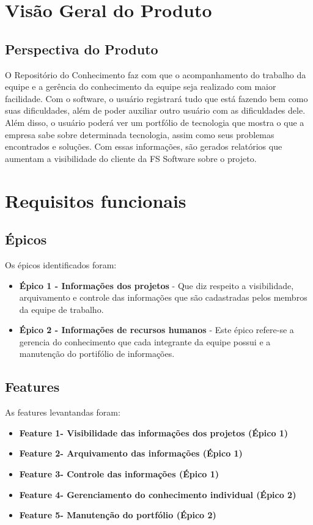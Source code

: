 \section{Visão Geral do Produto}

\subsection{Perspectiva do Produto}
O Repositório do Conhecimento faz com que o acompanhamento do trabalho da equipe e a gerência do conhecimento da equipe seja realizado com maior facilidade. Com o software, o usuário registrará tudo que está fazendo bem como suas dificuldades, além de poder auxiliar outro usuário com as dificuldades dele. Além disso, o usuário poderá ver um portfólio de tecnologia que mostra o que a empresa sabe sobre determinada tecnologia, assim como seus problemas encontrados e soluções. Com essas informações, são gerados relatórios que aumentam a visibilidade do cliente da FS Software sobre o projeto.

\section{Requisitos funcionais}

\subsection{Épicos}
Os épicos identificados foram:
\begin{itemize}
\item \textbf{Épico 1 - Informações dos projetos} - Que diz respeito a visibilidade, arquivamento e controle das informações que são cadastradas pelos membros da equipe de trabalho. 
\item \textbf{Épico 2 - Informações de recursos humanos} - Este épico refere-se a gerencia do conhecimento que cada integrante da equipe possui e a manutenção do portifólio de informações.
\end{itemize}

\subsection{Features}
As features levantandas foram:
\begin{itemize}
\item \textbf{Feature 1- Visibilidade das informações dos projetos (Épico 1)}
\item \textbf{Feature 2- Arquivamento das informações (Épico 1)}
\item \textbf{Feature 3- Controle das informações (Épico 1)}
\item \textbf{Feature 4- Gerenciamento do conhecimento individual (Épico 2)}
\item \textbf{Feature 5- Manutenção do portfólio (Épico 2)}
\end{itemize}

